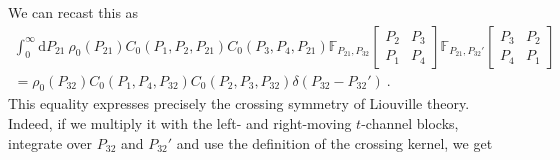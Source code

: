 \documentclass[12pt,a4paper]{article}
\begin{document}
We can recast this as
\begin{multline}
    \int_0^\infty\!\! \mathrm{d}P_{21}\ \rho_0(P_{21}) C_0(P_1,P_2,P_{21}) C_0(P_3,P_4,P_{21})\mathbb{F}_{P_{21},P_{32}}\!\begin{bmatrix}
P_2 & P_3 \\
P_1 & P_4
\end{bmatrix}
\mathbb{F}_{P_{21},P_{32}'}\!\begin{bmatrix}
P_3 & P_2 \\
P_4 & P_1
\end{bmatrix} 
\\
=\rho_0(P_{32})C_0(P_1,P_4,P_{32})C_0(P_2,P_3,P_{32})\delta(P_{32}-P_{32}')\ . \label{eq:crossing symmetry Liouville theory}
\end{multline}
This equality expresses precisely the crossing symmetry of Liouville theory. Indeed, if we multiply it with the left- and right-moving $t$-channel blocks, integrate over $P_{32}$ and $P_{32}'$ and use the definition of the crossing kernel, we get
\end{document}
